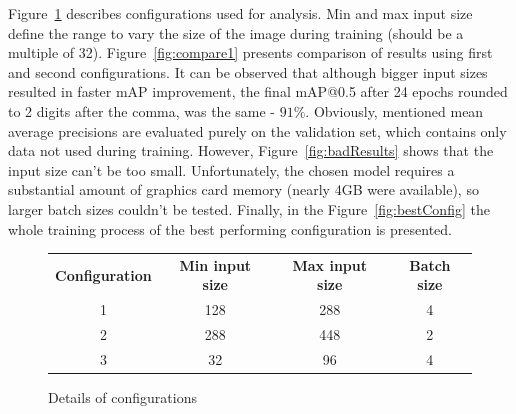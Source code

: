 \documentclass{article}
\begin{document}
    Figure~\ref{fig:configurations1} describes configurations used for analysis.
    Min and max input size define the range to vary the size of the image during training (should be a multiple of 32).
    Figure~\ref{fig:compare1} presents comparison of results using first and second configurations.
    It can be observed that although bigger input sizes resulted in faster mAP improvement, the final mAP@0.5 after 24 epochs rounded to 2 digits after the comma, was the same - $91\%$.
    Obviously, mentioned mean average precisions are evaluated purely on the validation set, which contains only data not used during training.
    However, Figure~\ref{fig:badResults} shows that the input size can't be too small.
    Unfortunately, the chosen model requires a substantial amount of graphics card memory (nearly 4GB were available), so larger batch sizes couldn't be tested.
    Finally, in the Figure~\ref{fig:bestConfig} the whole training process of the best performing configuration is presented.

    \begin{figure}[!h]
        \centering
        \begin{tabular}{cccc}
            \textbf{Configuration} & \textbf{Min input size} & \textbf{Max input size} & \textbf{Batch size} \\
            1 & 128 & 288 & 4 \\
            2 & 288 & 448 & 2 \\
            3 & 32 & 96 & 4 \\
        \end{tabular}
        \caption{Details of configurations}
        \label{fig:configurations1}
    \end{figure}
\end{document}
